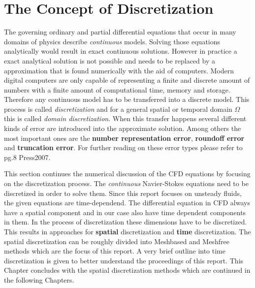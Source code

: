 

\chapter{ The Concept of Discretization } \label{sec:Discretization}

The governing ordinary and partial differential equations that occur in many domains of physics describe
\emph{continuous} models. Solving those equations analytically would result in exact continuous solutions. However in practice
a exact analytical solution is not possible and needs to be replaced by a approximation that is found numerically with the aid of computers.
Modern digital computers are only capable of representing a finite and discrete amount of numbers with a finite amount of computational time, memory and storage.
Therefore any continuous model has to be transferred into a discrete model. This process is called \emph{discretization} and for a general spatial or temporal domain $ \Omega $ this is called \emph{domain discretization}. When this transfer happens several different kinds
of error are introduced into the approximate solution. Among others the most important ones are the \textbf{number representation error}, \textbf{roundoff error} and \textbf{truncation error}. For further reading on these error types please refer to pg.8 Press2007.

This section continues the numerical discussion of the CFD equations by focusing on the discretization process. The \emph{continuous} Navier-Stokes equations need to be 
discretized in order to solve them. Since this report focuses on unsteady fluids, the given equations are time-dependend. The differential equation in CFD always have a spatial component and in our case also have time dependent components in them. In the process of discretization these dimensions have to be discretized. This results in approaches for \textbf{spatial} discretization and \textbf{time} discretization. The spatial discretization can be roughly divided into Meshbased and Meshfree methods which are the focus of this report. A very brief outline into time discretization is given to better understand the proceedings of this report.  This Chapter concludes with the spatial discretization methods which are continued in the following Chapters. 


